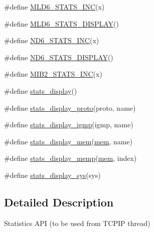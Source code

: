 \begin{DoxyCompactItemize}
\item 
\#define \hyperlink{openmote-cc2538_2lwip_2src_2include_2lwip_2stats_8h_a0cbb73791354db59a64c6d0300e3b4cb}{M\+L\+D6\+\_\+\+S\+T\+A\+T\+S\+\_\+\+I\+NC}(x)
\item 
\#define \hyperlink{openmote-cc2538_2lwip_2src_2include_2lwip_2stats_8h_a018cf6f11dad2650f0387ac97b7f41e5}{M\+L\+D6\+\_\+\+S\+T\+A\+T\+S\+\_\+\+D\+I\+S\+P\+L\+AY}()
\item 
\#define \hyperlink{openmote-cc2538_2lwip_2src_2include_2lwip_2stats_8h_a5c508f5734163d7ce6ac7c1227500867}{N\+D6\+\_\+\+S\+T\+A\+T\+S\+\_\+\+I\+NC}(x)
\item 
\#define \hyperlink{openmote-cc2538_2lwip_2src_2include_2lwip_2stats_8h_a82730a5b7c1639033d62deab1c572a4e}{N\+D6\+\_\+\+S\+T\+A\+T\+S\+\_\+\+D\+I\+S\+P\+L\+AY}()
\item 
\#define \hyperlink{openmote-cc2538_2lwip_2src_2include_2lwip_2stats_8h_a237a8f1e47af42fb612e936e928a9ced}{M\+I\+B2\+\_\+\+S\+T\+A\+T\+S\+\_\+\+I\+NC}(x)
\item 
\#define \hyperlink{openmote-cc2538_2lwip_2src_2include_2lwip_2stats_8h_aed60ffa8a5b8bacdcf0f8204bd95a881}{stats\+\_\+display}()
\item 
\#define \hyperlink{openmote-cc2538_2lwip_2src_2include_2lwip_2stats_8h_a0a3b76c2f476e34cde79de0cca51887f}{stats\+\_\+display\+\_\+proto}(proto,  name)
\item 
\#define \hyperlink{openmote-cc2538_2lwip_2src_2include_2lwip_2stats_8h_a5fc0d790a4aadf108ebdc7f6c58d0113}{stats\+\_\+display\+\_\+igmp}(igmp,  name)
\item 
\#define \hyperlink{openmote-cc2538_2lwip_2src_2include_2lwip_2stats_8h_a8fd0f5a8680322d2a9776258c815cdab}{stats\+\_\+display\+\_\+mem}(\hyperlink{structmem}{mem},  name)
\item 
\#define \hyperlink{openmote-cc2538_2lwip_2src_2include_2lwip_2stats_8h_a6b8be67cc5fe751f2076de9e9a34c5cc}{stats\+\_\+display\+\_\+memp}(\hyperlink{structmem}{mem},  index)
\item 
\#define \hyperlink{openmote-cc2538_2lwip_2src_2include_2lwip_2stats_8h_adb5c64ed647bd5227ab2161b1570b1bb}{stats\+\_\+display\+\_\+sys}(sys)
\end{DoxyCompactItemize}


\subsection{Detailed Description}
Statistics A\+PI (to be used from T\+C\+P\+IP thread) 

